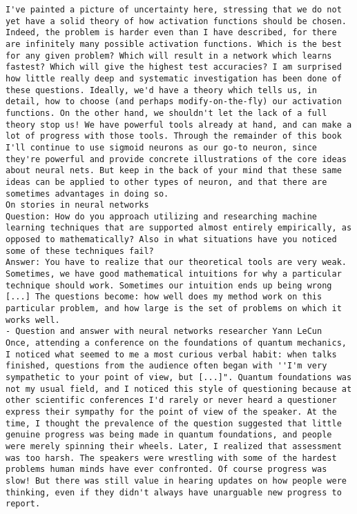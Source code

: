 \begin{lstlisting}
I've painted a picture of uncertainty here, stressing that we do not yet have a solid theory of how activation functions should be chosen. Indeed, the problem is harder even than I have described, for there are infinitely many possible activation functions. Which is the best for any given problem? Which will result in a network which learns fastest? Which will give the highest test accuracies? I am surprised how little really deep and systematic investigation has been done of these questions. Ideally, we'd have a theory which tells us, in detail, how to choose (and perhaps modify-on-the-fly) our activation functions. On the other hand, we shouldn't let the lack of a full theory stop us! We have powerful tools already at hand, and can make a lot of progress with those tools. Through the remainder of this book I'll continue to use sigmoid neurons as our go-to neuron, since they're powerful and provide concrete illustrations of the core ideas about neural nets. But keep in the back of your mind that these same ideas can be applied to other types of neuron, and that there are sometimes advantages in doing so.
On stories in neural networks
Question: How do you approach utilizing and researching machine learning techniques that are supported almost entirely empirically, as opposed to mathematically? Also in what situations have you noticed some of these techniques fail?
Answer: You have to realize that our theoretical tools are very weak. Sometimes, we have good mathematical intuitions for why a particular technique should work. Sometimes our intuition ends up being wrong [...] The questions become: how well does my method work on this particular problem, and how large is the set of problems on which it works well.
- Question and answer with neural networks researcher Yann LeCun
Once, attending a conference on the foundations of quantum mechanics, I noticed what seemed to me a most curious verbal habit: when talks finished, questions from the audience often began with ''I'm very sympathetic to your point of view, but [...]". Quantum foundations was not my usual field, and I noticed this style of questioning because at other scientific conferences I'd rarely or never heard a questioner express their sympathy for the point of view of the speaker. At the time, I thought the prevalence of the question suggested that little genuine progress was being made in quantum foundations, and people were merely spinning their wheels. Later, I realized that assessment was too harsh. The speakers were wrestling with some of the hardest problems human minds have ever confronted. Of course progress was slow! But there was still value in hearing updates on how people were thinking, even if they didn't always have unarguable new progress to report.

\end{lstlisting}
